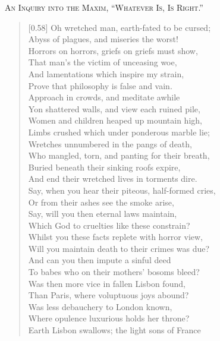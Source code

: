 \begin{center}
\textsc{An Inquiry into the Maxim, ``Whatever Is, Is Right.''}
\end{center}

\begin{verse}[0.58\textwidth]\normalsize
Oh wretched man, earth-fated to be cursed;\\
Abyss of plagues, and miseries the worst!\\
Horrors on horrors, griefs on griefs must show,\\
That man's the victim of unceasing woe,\\
And lamentations which inspire my strain,\\
Prove that philosophy is false and vain.\\
Approach in crowds, and meditate awhile\\
Yon shattered walls, and view each ruined pile,\\
Women and children heaped up mountain high,\\
Limbs crushed which under ponderous marble lie;\\
Wretches unnumbered in the pangs of death,\\
Who mangled, torn, and panting for their breath,\\
Buried beneath their sinking roofs expire,\\
And end their wretched lives in torments dire.\\
Say, when you hear their piteous, half-formed cries,\\
Or from their ashes see the smoke arise,\\
Say, will you then eternal laws maintain,\\
Which God to cruelties like these constrain?\\
Whilst you these facts replete with horror view,\\
Will you maintain death to their crimes was due?\\
And can you then impute a sinful deed\\
To babes who on their mothers' bosoms bleed?\\
Was then more vice in fallen Lisbon found,\\
Than Paris, where voluptuous joys abound?\\
Was less debauchery to London known,\\
Where opulence luxurious holds her throne?\\
Earth Lisbon swallows; the light sons of France\\

\end{verse}
